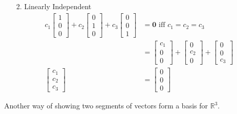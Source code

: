\documentclass[main.tex]{subfiles}
\begin{document}
\begin{enumerate}
    \item[2.] Linearly Independent
    $$
    \begin{aligned}
    c_1\left[\begin{array}{l}
    1 \\
    0 \\
    0
    \end{array}\right]+c_{2}\left[\begin{array}{l}
    0 \\
    1 \\
    0
    \end{array}\right]+c_{3}\left[\begin{array}{l}
    0 \\
    0 \\
    1
    \end{array}\right] &= \bm{0} \text { iff } c_{1}=c_{2}=c_{3} \\
    &= {\left[\begin{array}{l}
    c_1 \\
    0 \\
    0
    \end{array}\right]+\left[\begin{array}{l}
    0 \\
    c_{2} \\
    0
    \end{array}\right]+\left[\begin{array}{l}
    0 \\
    0 \\
    c_{3}
    \end{array}\right] } \\
    \left[\begin{array}{l}
    c_1 \\
    c_2 \\
    c_3
    \end{array}\right] &=\left[\begin{array}{l}
    0 \\
    0 \\
    0
    \end{array}\right]
    \end{aligned}
    $$
\end{enumerate}

Another way of showing two segments of vectors form a basis for $\mathbb{R}^{3}$.
\end{document}
